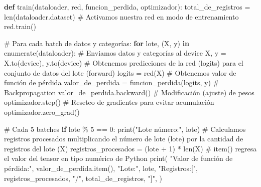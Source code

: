 \documentclass[
  10pt,
]{article}
\newenvironment{Shaded}{\begin{snugshade}}{\end{snugshade}}
\newcommand{\BuiltInTok}[1]{\textcolor[rgb]{0.00,0.23,0.31}{#1}}
\newcommand{\CommentTok}[1]{\textcolor[rgb]{0.37,0.37,0.37}{#1}}
\newcommand{\ControlFlowTok}[1]{\textcolor[rgb]{0.00,0.23,0.31}{\textbf{#1}}}
\newcommand{\DecValTok}[1]{\textcolor[rgb]{0.68,0.00,0.00}{#1}}
\newcommand{\KeywordTok}[1]{\textcolor[rgb]{0.00,0.23,0.31}{\textbf{#1}}}
\newcommand{\NormalTok}[1]{\textcolor[rgb]{0.00,0.23,0.31}{#1}}
\newcommand{\OperatorTok}[1]{\textcolor[rgb]{0.37,0.37,0.37}{#1}}
\newcommand{\StringTok}[1]{\textcolor[rgb]{0.13,0.47,0.30}{#1}}
\begin{document}
\begin{Shaded}
\begin{Highlighting}[]
\KeywordTok{def}\NormalTok{ train(dataloader, red, funcion\_perdida, optimizador):}
\NormalTok{    total\_de\_registros }\OperatorTok{=} \BuiltInTok{len}\NormalTok{(dataloader.dataset)}
    \CommentTok{\# Activamos nuestra red en modo de entrenamiento}
\NormalTok{    red.train()}

    \CommentTok{\# Para cada batch de datos y categorías:}
    \ControlFlowTok{for}\NormalTok{ lote, (X, y) }\KeywordTok{in} \BuiltInTok{enumerate}\NormalTok{(dataloader):}
        \CommentTok{\# Enviamos datos y categorías al device}
\NormalTok{        X, y }\OperatorTok{=}\NormalTok{ X.to(device), y.to(device)}
        \CommentTok{\# Obtenemos predicciones de la red (logits) para el conjunto de datos del lote (forward)}
\NormalTok{        logits }\OperatorTok{=}\NormalTok{ red(X)}
        \CommentTok{\# Obtenemos valor de función de pérdida}
\NormalTok{        valor\_de\_perdida }\OperatorTok{=}\NormalTok{ funcion\_perdida(logits, y)}
        \CommentTok{\# Backpropagation}
\NormalTok{        valor\_de\_perdida.backward()}
        \CommentTok{\# Modificación (ajuste) de pesos}
\NormalTok{        optimizador.step()}
        \CommentTok{\# Reseteo de gradientes para evitar acumulación}
\NormalTok{        optimizador.zero\_grad()}

        \CommentTok{\# Cada 5 batches}
        \ControlFlowTok{if}\NormalTok{ lote }\OperatorTok{\%} \DecValTok{5} \OperatorTok{==} \DecValTok{0}\NormalTok{:}
            \BuiltInTok{print}\NormalTok{(}\StringTok{"Lote número:"}\NormalTok{, lote)}
            \CommentTok{\# Calculamos registros procesados multiplicando el número de lote (\textasciigrave{}lote\textasciigrave{}) por la cantidad de registros del lote (\textasciigrave{}X\textasciigrave{})}
\NormalTok{            registros\_procesados }\OperatorTok{=}\NormalTok{ (lote }\OperatorTok{+} \DecValTok{1}\NormalTok{) }\OperatorTok{*} \BuiltInTok{len}\NormalTok{(X)}
            \CommentTok{\# item() regresa el valor del tensor en tipo numérico de Python}
            \BuiltInTok{print}\NormalTok{(}
                \StringTok{"Valor de función de pérdida:"}\NormalTok{,}
\NormalTok{                valor\_de\_perdida.item(),}
                \StringTok{"Lote:"}\NormalTok{,}
\NormalTok{                lote,}
                \StringTok{"Registros:["}\NormalTok{,}
\NormalTok{                registros\_procesados,}
                \StringTok{"/"}\NormalTok{,}
\NormalTok{                total\_de\_registros,}
                \StringTok{"]"}\NormalTok{,}
\NormalTok{            )}
\end{Highlighting}
\end{Shaded}
\end{document}
